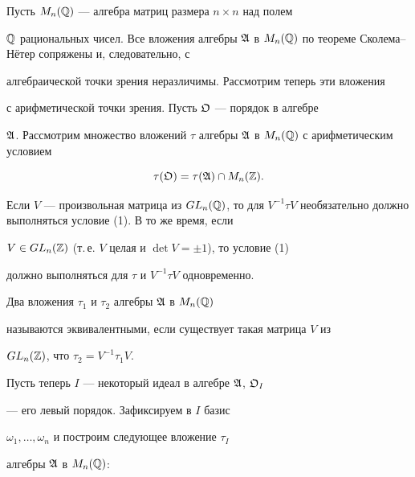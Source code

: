  


Пусть $M_n(\Bbb Q)$ --- алгебра матриц размера $n\times n$ над полем 


$\Bbb Q$ рациональных чисел. Все вложения алгебры $\frak A$ в $M_n(\Bbb 


Q)$ по теореме Сколема--Н\"етер сопряжены и, следовательно, с 


алгебраической точки зрения неразличимы. Рассмотрим теперь эти вложения 


с арифметической точки зрения. Пусть $\frak O$ --- порядок в алгебре 


$\frak A$. Рассмотрим множество вложений $\tau$ алгебры $\frak A$ в $M_n(\Bbb 


Q)$ с арифметическим условием 


\begin{equation} 


\tau(\frak O)=\tau(\frak A)\cap M_n(\Bbb Z). 


\end{equation} 


Если $V$ --- произвольная матрица из $GL_n(\Bbb Q)$, то для $V^{-1}\tau 


V$ необязательно должно выполняться условие (1). В то же время, если 


$V\in GL_n(\Bbb Z)$ (т.\,е. $V$ целая и $\det V=\pm1$), то условие (1) 


должно выполняться для $\tau$ и $V^{-1}\tau V$ одновременно. 


 


\begin{defn} 


Два вложения $\tau_1$ и $\tau_2$ алгебры $\frak A$ в $M_n(\Bbb Q)$ 


называются эквивалентными, если существует такая матрица $V$ из 


$GL_n(\Bbb Z)$, что $\tau_2=V^{-1}\tau_1V$. 


\end{defn} 


 


Пусть теперь $I$ --- некоторый идеал в алгебре $\frak A$, $\frak O_I$ 


--- его левый порядок. Зафиксируем в $I$ базис 


$\omega_1,\dotsc,\omega_n$ и построим следующее вложение $\tau_I$ 


алгебры $\frak A$ в $M_n(\Bbb Q)$: 


$$ 


